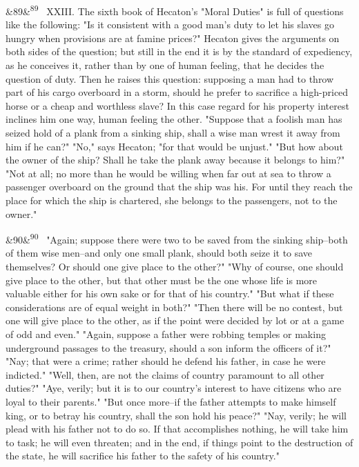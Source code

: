 \documentclass[12pt]{article}
\newcommand{\para}[1][]{\par\noindent\ifx&#1&\else\textsuperscript{\footnotesize #1}~\fi}
\begin{document}
\para[89] XXIII. The sixth book of Hecaton's "Moral Duties" is full of questions like the following: "Is it consistent with a good man's duty to let his slaves go hungry when provisions are at famine prices?" Hecaton gives the arguments on both sides of the question; but still in the end it is by the standard of expediency, as he conceives it, rather than by one of human feeling, that he decides the question of duty. Then he raises this question: supposing a man had to throw part of his cargo overboard in a storm, should he prefer to sacrifice a high-priced horse or a cheap and worthless slave? In this case regard for his property interest inclines him one way, human feeling the other. "Suppose that a foolish man has seized hold of a plank from a sinking ship, shall a wise man wrest it away from him if he can?" "No," says Hecaton; "for that would be unjust." "But how about the owner of the ship? Shall he take the plank away because it belongs to him?" "Not at all; no more than he would be willing when far out at sea to throw a passenger overboard on the ground that the ship was his. For until they reach the place for which the ship is chartered, she belongs to the passengers, not to the owner."

\para[90] "Again; suppose there were two to be saved from the sinking ship--both of them wise men--and only one small plank, should both seize it to save themselves? Or should one give place to the other?" "Why of course, one should give place to the other, but that other must be the one whose life is more valuable either for his own sake or for that of his country." "But what if these considerations are of equal weight in both?" "Then there will be no contest, but one will give place to the other, as if the point were decided by lot or at a game of odd and even." "Again, suppose a father were robbing temples or making underground passages to the treasury, should a son inform the officers of it?" "Nay; that were a crime; rather should he defend his father, in case he were indicted." "Well, then, are not the claims of country paramount to all other duties?" "Aye, verily; but it is to our country's interest to have citizens who are loyal to their parents." "But once more--if the father attempts to make himself king, or to betray his country, shall the son hold his peace?" "Nay, verily; he will plead with his father not to do so. If that accomplishes nothing, he will take him to task; he will even threaten; and in the end, if things point to the destruction of the state, he will sacrifice his father to the safety of his country."
\end{document}
